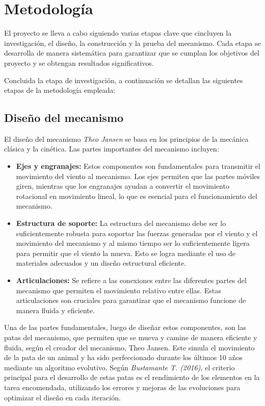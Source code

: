 \section{Metodología}

El proyecto se lleva a cabo siguiendo varias etapas clave que cincluyen la investigación, el diseño, la construcción y la prueba del mecanismo. Cada etapa se desarrolla de manera sistemática para garantizar que se cumplan los objetivos del proyecto y se obtengan resultados significativos. 

Concluida la etapa de investigación, a continuación se detallan las siguientes etapas de la metodología empleada:

\subsection{Diseño del mecanismo}

El diseño del mecanismo \textit{Theo Jansen} se basa en los principios de la mecánica clásica y la cinética. Las partes importantes del mecanismo incluyen:

\begin{itemize}
  \item \textbf{Ejes y engranajes:} Estos componentes son fundamentales para transmitir el movimiento del viento al mecanismo. Los ejes permiten que las partes móviles giren, mientras que los engranajes ayudan a convertir el movimiento rotacional en movimiento lineal, lo que es esencial para el funcionamiento del mecanismo.
  \item \textbf{Estructura de soporte:} La estructura del mecanismo debe ser lo suficientemente robusta para soportar las fuerzas generadas por el viento y el movimiento del mecanismo y al mismo tiempo ser lo suficientemente ligera para permitir que el viento la mueva. Esto se logra mediante el uso de materiales adecuados y un diseño estructural eficiente.
  \item \textbf{Articulaciones:} Se refiere a las conexiones entre las diferentes partes del mecanismo que permiten el movimiento relativo entre ellas. Estas articulaciones son cruciales para garantizar que el mecanismo funcione de manera fluida y eficiente.
\end{itemize}

Una de las partes fundamentales, luego de diseñar estos componentes, son las patas del mecanismo, que permiten que se mueva y camine de manera eficiente y fluida, según el creador del mecanismo, Theo Jansen. Este simula el movimiento de la pata de un animal y ha sido perfeccionado durante los últimos 10 años mediante un algoritmo evolutivo. Según \textit{Bustamante T. (2016)}, el criterio principal para el desarrollo de estas patas es el rendimiento de los elementos en la tarea encomendada, utilizando los errores y mejoras de las evoluciones para optimizar el diseño en cada iteración. \cite{tellez2016diseno}

